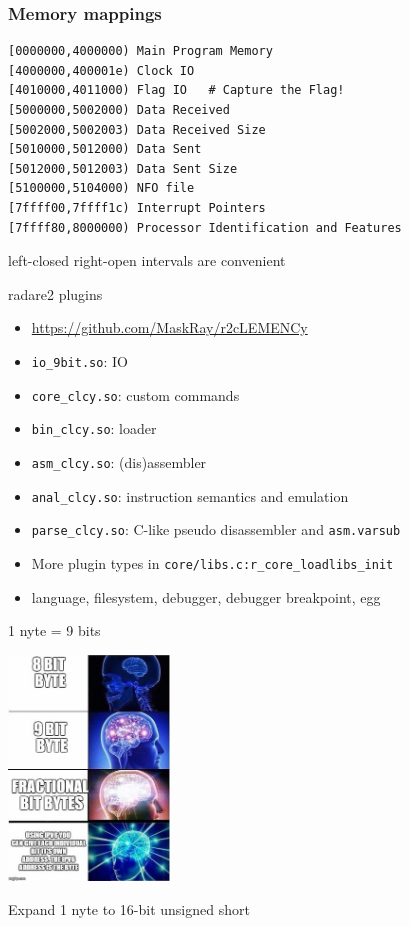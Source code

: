 \documentclass{beamer}
\begin{document}
\begin{frame}[fragile]
  \frametitle{Memory mappings}
  \footnotesize
  \begin{verbatim}
[0000000,4000000) Main Program Memory
[4000000,400001e) Clock IO
[4010000,4011000) Flag IO   # Capture the Flag!
[5000000,5002000) Data Received
[5002000,5002003) Data Received Size
[5010000,5012000) Data Sent
[5012000,5012003) Data Sent Size
[5100000,5104000) NFO file
[7ffff00,7ffff1c) Interrupt Pointers
[7ffff80,8000000) Processor Identification and Features
  \end{verbatim}
  \begin{center}
    \Large left-closed right-open intervals are convenient
  \end{center}
\end{frame}

\begin{frame}{radare2 plugins}
  \begin{itemize}
    \item \url{https://github.com/MaskRay/r2cLEMENCy}
    \item \texttt{io\_9bit.so}: IO
    \item \texttt{core\_clcy.so}: custom commands
    \item \texttt{bin\_clcy.so}: loader
    \item \texttt{asm\_clcy.so}: (dis)assembler
    \item \texttt{anal\_clcy.so}: instruction semantics and emulation
    \item \texttt{parse\_clcy.so}: C-like pseudo disassembler and \texttt{asm.varsub}
    \item More plugin types in \texttt{core/libs.c:r\_core\_loadlibs\_init}
    \item language, filesystem, debugger, debugger breakpoint, egg
  \end{itemize}
\end{frame}

\begin{frame}{1 nyte = 9 bits}
  \begin{center}
    \includegraphics[height=6cm]{9-bit.jpg}
  \end{center}
  \begin{center}
    \Large Expand 1 nyte to 16-bit unsigned short
  \end{center}
\end{frame}
\end{document}
